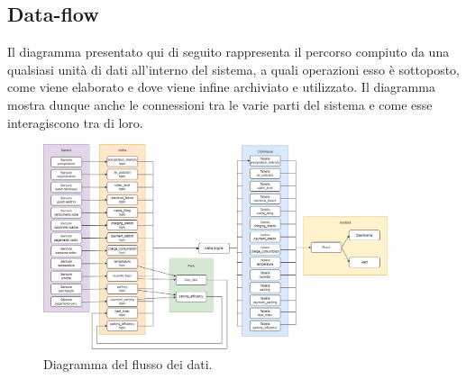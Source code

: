 \documentclass[8pt]{article}
\begin{document}
\subsection{Data-flow}
Il diagramma presentato qui di seguito rappresenta il percorso compiuto da una qualsiasi unità di dati all'interno del sistema, a quali operazioni esso è sottoposto, come viene elaborato e dove viene infine archiviato e utilizzato. Il diagramma mostra dunque anche le connessioni tra le varie parti del sistema e come esse interagiscono tra di loro.
\begin{figure}[h!]
    \centering
    \includegraphics[width=0.9\textwidth]{images_st/flusso.png}
    \caption{Diagramma del flusso dei dati.}
    \label{fig:Diagramma del flusso dei dati}
\end{figure}
\end{document}
